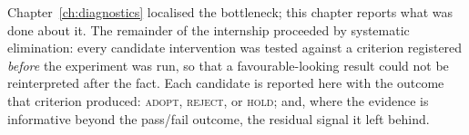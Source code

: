 Chapter~\ref{ch:diagnostics} localised the bottleneck; this chapter reports
what was done about it. The remainder of the internship proceeded by
systematic elimination: every candidate intervention was tested against a
criterion registered \emph{before} the experiment was run, so that a
favourable-looking result could not be reinterpreted after the fact. Each
candidate is reported here with the outcome that criterion produced:
\textsc{adopt}, \textsc{reject}, or \textsc{hold}; and, where the
evidence is informative beyond the pass/fail outcome, the residual signal
it left behind.
